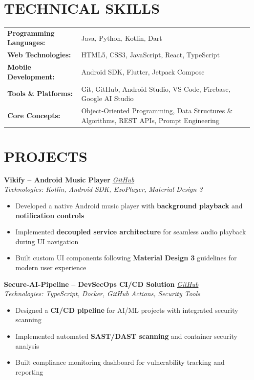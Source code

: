 \documentclass[10pt, letterpaper]{article}
\begin{document}
\section{TECHNICAL SKILLS}
\begin{tabularx}{\linewidth}{@{}l X@{}}
    \textbf{Programming Languages:} & Java, Python, Kotlin, Dart \\
    \textbf{Web Technologies:} & HTML5, CSS3, JavaScript, React, TypeScript \\
    \textbf{Mobile Development:} & Android SDK, Flutter, Jetpack Compose \\
    \textbf{Tools \& Platforms:} & Git, GitHub, Android Studio, VS Code, Firebase, Google AI Studio \\
    \textbf{Core Concepts:} & Object-Oriented Programming, Data Structures \& Algorithms, REST APIs, Prompt Engineering \\
\end{tabularx}

\section{PROJECTS}

\textbf{Vikify – Android Music Player} \hfill \href{https://github.com/TheCraftsman1/vikify}{\textit{GitHub}} \\
\textit{Technologies: Kotlin, Android SDK, ExoPlayer, Material Design 3}
\begin{itemize}[noitemsep, leftmargin=*, topsep=2pt]
    \item Developed a native Android music player with \textbf{background playback} and \textbf{notification controls}
    \item Implemented \textbf{decoupled service architecture} for seamless audio playback during UI navigation
    \item Built custom UI components following \textbf{Material Design 3} guidelines for modern user experience
\end{itemize}

\vspace{4pt}
\textbf{Secure-AI-Pipeline – DevSecOps CI/CD Solution} \hfill \href{https://github.com/TheCraftsman1/Secure-AI-pipeline}{\textit{GitHub}} \\
\textit{Technologies: TypeScript, Docker, GitHub Actions, Security Tools}
\begin{itemize}[noitemsep, leftmargin=*, topsep=2pt]
    \item Designed a \textbf{CI/CD pipeline} for AI/ML projects with integrated security scanning
    \item Implemented automated \textbf{SAST/DAST scanning} and container security analysis
    \item Built compliance monitoring dashboard for vulnerability tracking and reporting
\end{itemize}
\end{document}
